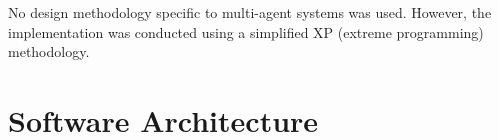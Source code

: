\documentclass{llncs2e/llncs}
\begin{document}
    No design methodology specific to multi-agent systems was used. However, 
    the implementation was conducted using a simplified XP (extreme programming) 
    methodology.

\begin{comment}
    algo parecido a esto:

    Since the desires have an important impact on the possible intentions that an 
    agent will pursue, our approach focuses on refining the way desires are 
    generated.

    poner algo que justifique esto, y refrasear esto:

    sale de las prioridades de las metas

    This results in a less reactive and more autonomous way in which an agent acts.

    las intenciones son muy simples, reduciendo la necesidad de un planificador
    
    Since the intentions specified for the agents are simple, the need for 
    predefined plans or a planning component to generate a sequence of actions 
    from an intention.

    Our intention-based agents generate many possible desires in most of the 
    turns, and selects the best they can find, given their knowledge of the world. 
    They try to accomplish that intention, for several turns, until they finish, 
    or they find another reason to stop, and recalculate their intention.

    Each turn, the obtained percept is used to decide which intention is going to 
    be selected (when the agent hasn't got any), or it's used to decide whether it 
    is necessary to carry on the actual intention, or recalculate it. This happens 
    when the intention has been achieved (by the agent or other teammate), when 
    it's no longer necessary, when something else may be more important to do, or 
    when the agent is in danger.
\end{comment}

\section{Software Architecture}
\end{document}
